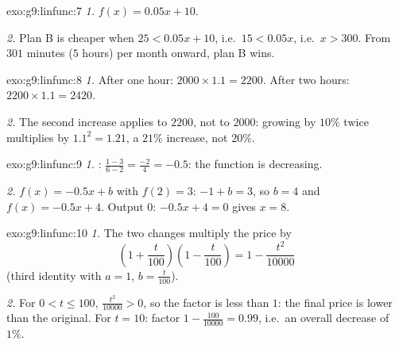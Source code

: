 \begin{solution}{exo:g9:linfunc:7}
\emph{1.} $f(x) = 0.05x + 10$.

\emph{2.} Plan B is cheaper when $25 < 0.05x + 10$, i.e.\
$15 < 0.05x$, i.e.\ $x > 300$. From $301$ minutes ($5$ hours) per month
onward, plan B wins.
\end{solution}

\begin{solution}{exo:g9:linfunc:8}
\emph{1.} After one hour: $2000 \times 1.1 = 2200$. After two hours:
$2200 \times 1.1 = 2420$.

\emph{2.} The second increase applies to $2200$, not to $2000$: growing
by $10\%$ twice multiplies by $1.1^2 = 1.21$, a $21\%$ increase, not
$20\%$.
\end{solution}

\begin{solution}{exo:g9:linfunc:9}
\emph{1.} : $\frac{1 - 3}{6 - 2} = \frac{-2}{4} = -0.5$: the
function is decreasing.

\emph{2.} $f(x) = -0.5x + b$ with $f(2) = 3$: $-1 + b = 3$, so $b = 4$
and $f(x) = -0.5x + 4$. Output $0$: $-0.5x + 4 = 0$ gives $x = 8$.
\end{solution}

\begin{solution}{exo:g9:linfunc:10}
\emph{1.} The two changes multiply the price by
\[
\left(1 + \frac{t}{100}\right)\left(1 - \frac{t}{100}\right)
= 1 - \frac{t^2}{10000}
\]
(third identity with $a = 1$, $b = \frac{t}{100}$).

\emph{2.} For $0 < t \leq 100$, $\frac{t^2}{10000} > 0$, so the factor
is less than $1$: the final price is lower than the original. For
$t = 10$: factor $1 - \frac{100}{10000} = 0.99$, i.e.\ an overall
decrease of $1\%$.
\end{solution}

